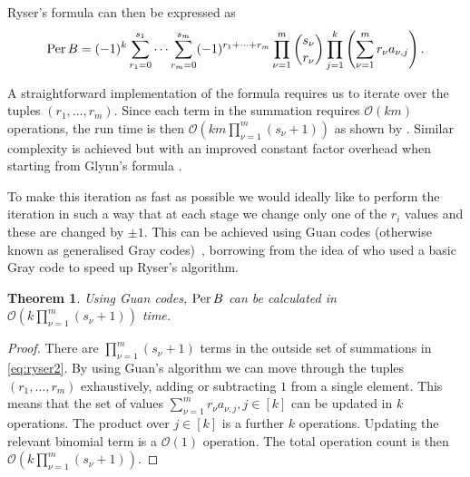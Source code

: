 \documentclass[a4paper,11pt]{article}
\newtheorem{thm}{Theorem}
\newcommand{\perm}{\mathop{\textup{Per}}}
\newcommand{\bigo}[1]{\mathcal{O}(#1)}
\begin{document}
Ryser's formula can then be expressed as
\begin{equation}\label{eq:ryser2}
\perm B = (-1)^k \sum_{r_1 = 0}^{s_1} \cdots \sum_{r_m = 0}^{s_m} (-1)^{r_1 + \cdots +r_m}\prod_{\nu=1}^m \binom{s_\nu}{r_\nu}  \prod_{j=1}^k \left(\sum_{\nu=1}^m r_\nu a_{\nu,j}\right).
\end{equation}

A straightforward implementation of the formula requires us to iterate over the tuples $(r_1,\dots, r_m)$. Since each term in the summation requires $\bigo{k m}$ operations, the run time is then $\bigo{k m \prod_{\nu=1}^m (s_\nu+1)}$ as shown by \citet{shchesnovich2013asymptotic}. Similar complexity is achieved but with an improved constant factor overhead when starting from Glynn's formula \citep{chin2018generalized}. 

To make this iteration as fast as possible we would ideally like to perform the iteration in such a way that at each stage we change only one of the $r_i$ values and these are changed by $\pm 1$.  This can be achieved using Guan codes (otherwise known as generalised Gray codes)~\citep{Guan:1998}, borrowing from the idea of \citet{NW:1978} who used a basic Gray code to speed up Ryser's algorithm.
\vspace{0.5em}


\begin{thm}\label{thm:guan} Using Guan codes, $\perm B$ can be calculated in $\bigo{k \prod_{\nu=1}^m (s_\nu+1)}$ time.
\end{thm}
\begin{proof}
	There are $\prod_{\nu=1}^m (s_\nu+1)$ terms in the outside set of summations in \eqref{eq:ryser2}.  By using Guan's algorithm we can move through the tuples $(r_1,\dots,r_m)$ exhaustively, adding or subtracting $1$ from a single element. This means that the set of values $\sum_{\nu=1}^m r_\nu a_{\nu,j}, j \in [k]$ can be updated in $k$ operations. The product over $j \in [k]$ is a further $k$ operations. Updating the relevant binomial term is a $\bigo{1}$ operation. The total operation count is then $\bigo{k \prod_{\nu=1}^m (s_\nu+1)}$.
\end{proof}
\end{document}
